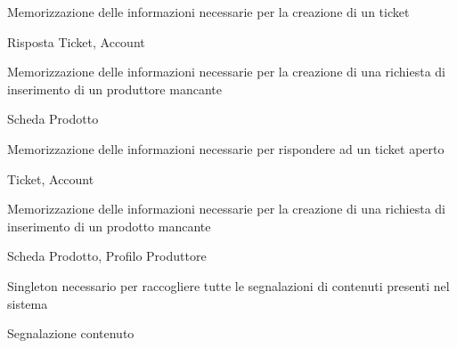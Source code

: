 
{\begin{itemWork}
	\item Memorizzazione delle informazioni necessarie per la creazione di un ticket
\end{itemWork}}
{\begin{itemWork}
	\item Risposta Ticket, Account
\end{itemWork}}


{\begin{itemWork}
	\item Memorizzazione delle informazioni necessarie per la creazione di una richiesta di inserimento di un produttore mancante
\end{itemWork}}
{\begin{itemWork}
	\item Scheda Prodotto
\end{itemWork}}



{\begin{itemWork}
	\item Memorizzazione delle informazioni necessarie per rispondere ad un ticket aperto
\end{itemWork}}
{\begin{itemWork}
	\item Ticket, Account
\end{itemWork}}


{\begin{itemWork}
	\item Memorizzazione delle informazioni necessarie per la creazione di una richiesta di inserimento di un prodotto mancante
\end{itemWork}}
{\begin{itemWork}
	\item Scheda Prodotto, Profilo Produttore
\end{itemWork}}


{\begin{itemWork}
	\item Singleton necessario per raccogliere tutte le segnalazioni di contenuti presenti nel sistema
\end{itemWork}}
{\begin{itemWork}
	\item Segnalazione contenuto
\end{itemWork}}


